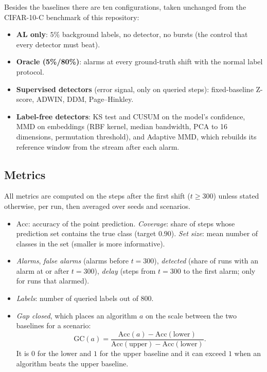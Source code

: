 \documentclass[11pt,a4paper]{article}
\newcommand{\acc}{\mathrm{Acc}}
\newcommand{\gap}{\mathrm{GC}}
\begin{document}
Besides the baselines there are ten configurations, taken unchanged from the CIFAR-10-C benchmark of this repository:
\begin{itemize}[nosep]
 \item \textbf{AL only}: $5\%$ background labels, no detector, no bursts (the control that every detector must beat).
 \item \textbf{Oracle (5\%/80\%)}: alarms at every ground-truth shift with the normal label protocol.
 \item \textbf{Supervised detectors} (error signal, only on queried steps): fixed-baseline Z-score, ADWIN, DDM, Page--Hinkley.
 \item \textbf{Label-free detectors}: KS test and CUSUM on the model's confidence, MMD on embeddings (RBF kernel, median bandwidth, PCA to 16 dimensions, permutation threshold), and Adaptive MMD, which rebuilds its reference window from the stream after each alarm.
\end{itemize}

\subsection{Metrics}

All metrics are computed on the steps after the first shift ($t\geq300$) unless stated otherwise, per run, then averaged over seeds and scenarios.
\begin{itemize}[nosep]
 \item $\acc$: accuracy of the point prediction. \emph{Coverage}: share of steps whose prediction set contains the true class (target $0.90$). \emph{Set size}: mean number of classes in the set (smaller is more informative).
 \item \emph{Alarms}, \emph{false alarms} (alarms before $t=300$), \emph{detected} (share of runs with an alarm at or after $t=300$), \emph{delay} (steps from $t=300$ to the first alarm; only for runs that alarmed).
 \item \emph{Labels}: number of queried labels out of 800.
 \item \emph{Gap closed}, which places an algorithm $a$ on the scale between the two baselines for a scenario:
 \begin{equation}
 \gap(a)=\frac{\acc(a)-\acc(\text{lower})}{\acc(\text{upper})-\acc(\text{lower})}.
 \label{eq:gap}
 \end{equation}
 It is $0$ for the lower and $1$ for the upper baseline and it can exceed $1$ when an algorithm beats the upper baseline.
\end{itemize}
\end{document}
